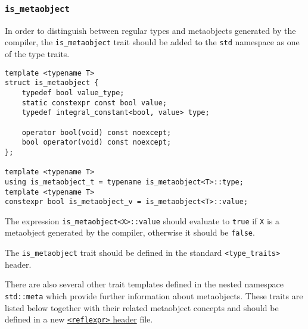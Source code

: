 \subsubsection{\texttt{is\_metaobject}}

In order to distinguish between regular types and metaobjects generated
by the compiler, the \texttt{is\_metaobject} trait should be added
to the \texttt{std} namespace as one of the type traits. 

\begin{verbatim}
template <typename T>
struct is_metaobject {
	typedef bool value_type;
	static constexpr const bool value;
	typedef integral_constant<bool, value> type;

	operator bool(void) const noexcept;
	bool operator(void) const noexcept;
};

template <typename T>
using is_metaobject_t = typename is_metaobject<T>::type;
template <typename T>
constexpr bool is_metaobject_v = is_metaobject<T>::value;
\end{verbatim}

The expression \texttt{is\_metaobject<X>::value} should evaluate to \texttt{true}
if \texttt{X} is a metaobject generated by the compiler, otherwise it should
be \texttt{false}.

The \texttt{is\_metaobject} trait should be defined in the standard
\texttt{<type\_traits>} header.

There are also several other trait templates defined in the nested namespace
\texttt{std::meta} which provide further information about metaobjects.
These traits are listed below together with their related metaobject concepts
and should be defined in a new
\hyperref[section-reflexpr-header]{\texttt{<reflexpr>} header} file.
